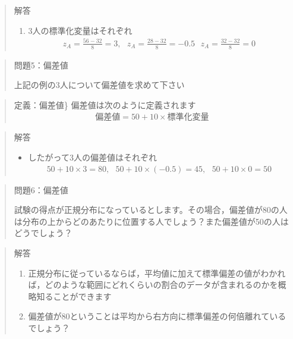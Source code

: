 \documentclass[
]{book}
\providecommand{\tightlist}{%
  \setlength{\itemsep}{0pt}\setlength{\parskip}{0pt}}
\theoremstyle{definition}
\theoremstyle{definition}
\theoremstyle{definition}
\theoremstyle{definition}
\theoremstyle{remark}
\begin{document}
\begin{quote}
解答

\begin{enumerate}
\def\labelenumi{\arabic{enumi}.}
\tightlist
\item
  3人の標準化変量はそれぞれ
  \begin{align*}
  z_A=\frac{56-32}{8}=3,~~~
  z_A=\frac{28-32}{8}=-0.5~~~
  z_A=\frac{32-32}{8}=0
  \end{align*}
\end{enumerate}
\end{quote}

\begin{quote}
問題5：偏差値

上記の例の3人について偏差値を求めて下さい
\end{quote}

\begin{quote}
定義：偏差値\}
偏差値は次のように定義されます
\begin{align*}
\text{偏差値}=50+10 \times \text{標準化変量}
\end{align*}
\end{quote}

\begin{quote}
解答

\begin{itemize}
\tightlist
\item
  したがって3人の偏差値はそれぞれ
  \begin{align*}
  50+10 \times 3=80,~~~
  50+10 \times (-0.5)=45,~~~ 
  50+10 \times 0=50
  \end{align*}
\end{itemize}
\end{quote}

\begin{quote}
問題6：偏差値

試験の得点が正規分布になっているとします。その場合，偏差値が80の人は分布の上からどのあたりに位置する人でしょう？また偏差値が50の人はどうでしょう？
\end{quote}

\begin{quote}
解答

\begin{enumerate}
\def\labelenumi{\arabic{enumi}.}
\item
  正規分布に従っているならば，平均値に加えて標準偏差の値がわかれば，どのような範囲にどれくらいの割合のデータが含まれるのかを概略知ることができます
\item
  偏差値が80ということは平均から右方向に標準偏差の何倍離れているでしょう？
\end{enumerate}
\end{quote}
\end{document}
